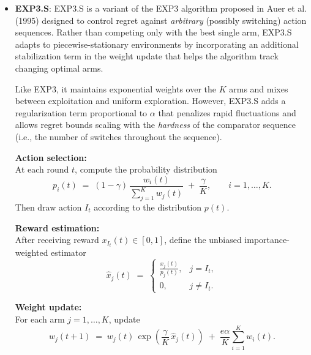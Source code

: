 \documentclass{scrartcl}
\begin{document}
\begin{itemize}
    After observing reward $R_t$, the value estimates are updated using the
    constant step-size rule:
    \[
        Q_{t+1}(I_t)
        =
        Q_t(I_t)
        +
        \alpha\,\big(R_t - Q_t(I_t)\big).
    \]

    Because the estimate $Q_t(i)$ places exponentially decaying weight on past
    rewards with weights proportional to $(1-\alpha)^k$ for $k$-step-old
    observations method adapts effectively to non-stationary reward
    distributions. Larger values of $\alpha$ allow faster adaptation, while
    smaller values provide greater stability.

    \item \textbf{EXP3.S}\cite{exp3s}:  
EXP3.S is a variant of the EXP3 algorithm proposed in Auer et al. (1995) \cite{exp3} designed to control regret against \emph{arbitrary} (possibly switching) action sequences.
Rather than competing only with the best single arm, EXP3.S adapts to
piecewise-stationary environments by incorporating an additional
stabilization term in the weight update that helps the algorithm track
changing optimal arms.

Like EXP3, it maintains exponential weights over the $K$ arms and mixes
between exploitation and uniform exploration.  
However, EXP3.S adds a regularization term proportional to 
$\alpha$ that penalizes rapid fluctuations and allows regret bounds
scaling with the \emph{hardness} of the comparator sequence (i.e., the number of switches throughout the sequence).

\vspace{4pt}
\textbf{Action selection:}\\
\quad At each round $t$, compute the probability distribution
\[
    p_i(t)
    \;=\;
    (1-\gamma)\,
    \frac{w_i(t)}{\sum_{j=1}^K w_j(t)}
    \;+\;
    \frac{\gamma}{K},
    \qquad i=1,\dots,K.
\]
\quad Then draw action $I_t$ according to the distribution $p(t)$.

\vspace{4pt}
\textbf{Reward estimation:}\\
After receiving reward $x_{I_t}(t) \in [0,1]$, define the unbiased
importance-weighted estimator
\[
    \widehat{x}_j(t)
    \;=\;
    \begin{cases}
        \displaystyle \frac{x_j(t)}{p_j(t)}, & j = I_t,\\[6pt]
        0, & j \neq I_t .
    \end{cases}
\]

\vspace{4pt}
\textbf{Weight update:}\\
For each arm $j = 1,\dots,K$, update
\[
    w_j(t+1)
    \;=\;
    w_j(t)\,
    \exp\!\left(\frac{\gamma}{K}\,\widehat{x}_j(t)\right)
    \;+\;
    \frac{e{\alpha}}{K}
    \sum_{i=1}^K w_i(t).
\]


\end{itemize}
\end{document}
